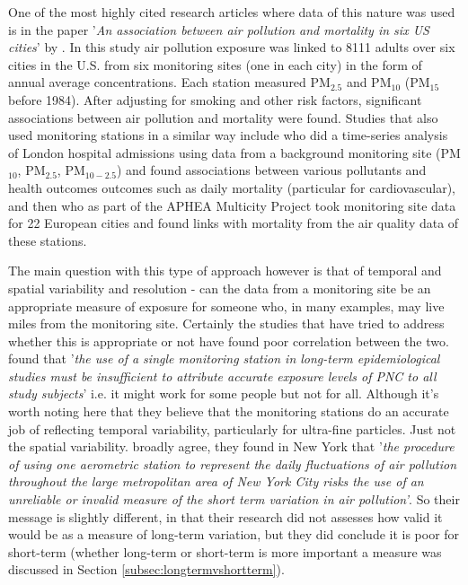 One of the most highly cited research articles where data of this nature was used is in the paper '\textit{An association between air pollution and mortality in six US cities}' by \cite{Dockery1993}. In this study air pollution exposure was linked to 8111 adults over six cities in the U.S. from six monitoring sites (one in each city) in the form of annual average concentrations. Each station measured PM$_{2.5}$ and PM$_{10}$ (PM$_{15}$ before 1984). After adjusting for smoking and other risk factors, significant associations between air pollution and mortality were found. Studies that also used monitoring stations in a similar way include \cite{Atkinson2010} who did a time-series analysis of London hospital admissions using data from a background monitoring site (PM$_{10}$, PM$_{2.5}$, PM$_{10-2.5}$) and found associations between various pollutants and health outcomes outcomes such as daily mortality (particular for cardiovascular), and then \cite{Samoli2005} who as part of the APHEA Multicity Project took monitoring site data for 22 European cities and found links with mortality from the air quality data of these stations.\hfill

The main question with this type of approach however is that of temporal and spatial variability and resolution - can the data from a monitoring site be an appropriate measure of exposure for someone who, in many examples, may live miles from the monitoring site. Certainly the studies that have tried to address whether this is appropriate or not have found poor correlation between the two. \cite{Cyrys2008} found that '\textit{the use of a single monitoring station in long-term epidemiological studies must be insufficient to attribute accurate exposure levels of PNC to all study subjects}' i.e. it might work for some people but not for all. Although it's worth noting here that they believe that the monitoring stations do an accurate job of reflecting temporal variability, particularly for ultra-fine particles. Just not the spatial variability. \cite{Goldstein197747} broadly agree, they found in New York that '\textit{the procedure of using one aerometric station to represent the daily fluctuations of air pollution throughout the large metropolitan area of New York City risks the use of an unreliable or invalid measure of the short term variation in air pollution'}. So their message is slightly different, in that their research did not assesses how valid it would be as a measure of long-term variation, but they did conclude it is poor for short-term (whether long-term or short-term is more important a measure was discussed in Section \ref{subsec:longtermvshortterm}).\hfill


